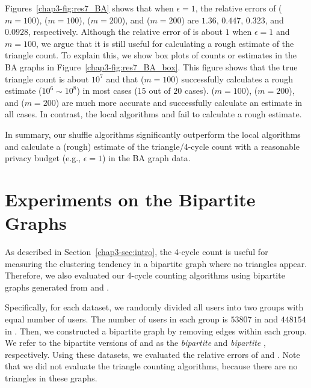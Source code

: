 Figures~\ref{chap3-fig:res7_BA} shows that when $\epsilon=1$, the relative errors of \AlgWSTriVR{} ($m=100$), \AlgWSCyc{} ($m=100$), \AlgWSTriVR{} ($m=200$), and \AlgWSCyc{} ($m=200$) are $1.36$, $0.447$, $0.323$, and $0.0928$, respectively.
Although the relative error of \AlgWSTriVR{} is about $1$ when $\epsilon=1$ and $m=100$, we argue that it is still useful for calculating a rough estimate of the triangle count.
To explain this, we show box plots of counts or estimates in the BA graphs in Figure~\ref{chap3-fig:res7_BA_box}.
This figure shows that the true triangle count is about $10^7$ and that \AlgWSTriVR{} ($m=100$) successfully calculates a rough estimate ($10^6 \sim 10^8$) in most cases ($15$ out of $20$ cases).
\AlgWSCyc{} ($m=100$), \AlgWSTriVR{} ($m=200$), and \AlgWSCyc{} ($m=200$) are much more accurate and successfully calculate an estimate in all cases.
In contrast, the local algorithms \AlgWLTri{} and \AlgWLCyc{} fail to calculate a rough estimate.

In summary, our shuffle algorithms significantly outperform the local algorithms and calculate a (rough) estimate of the triangle/4-cycle count with a reasonable privacy budget (e.g., $\epsilon=1$) in the BA graph data.

\section{Experiments on the Bipartite Graphs}
\label{chap3-sec:bipartite}
As described in Section~\ref{chap3-sec:intro}, the 4-cycle count is useful for measuring the clustering tendency in a bipartite graph where no triangles appear.
Therefore, we also evaluated our 4-cycle counting algorithms using bipartite graphs generated from \Gplus{} and \IMDB{}.

Specifically, for each dataset, we randomly divided all users into two groups with equal number of users.
The number of users in each group is $53807$ in \Gplus{} and $448154$ in \IMDB{}.
Then, we constructed a bipartite graph by removing edges within each group.
We refer to the bipartite versions of \Gplus{} and \IMDB{} as the \textit{bipartite \Gplus{}} and \textit{bipartite \IMDB{}}, respectively.
Using these datasets, we evaluated the relative errors of \AlgWSCyc{} and \AlgWLCyc{}.
Note that we did not evaluate the triangle counting algorithms, because there are no triangles in these graphs.

%   

